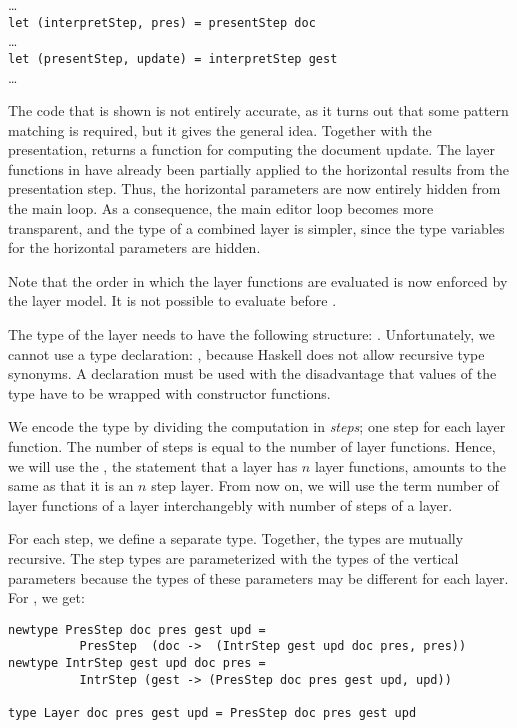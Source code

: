 \dots\\
{\tt let (interpretStep, pres) = presentStep doc}\\
\dots\\
{\tt let (presentStep, update) = interpretStep gest}\\
\dots

The code that is shown is not entirely accurate, as it turns out that some pattern matching is required, but it gives the general idea. Together with the presentation,  returns a function  for computing the document update. The layer functions in  have already been partially applied to the horizontal results from the presentation step. Thus, the horizontal parameters are now entirely hidden from the main loop.  As a consequence, the main editor loop becomes more transparent, and the type of a combined layer is simpler, since the type variables for the horizontal parameters are hidden.

\bc Note that the order in which the layer functions are evaluated is now enforced by the layer model. It is not possible to evaluate  before .  \ec



The type of the layer needs to have the following structure: 
.  Unfortunately, we cannot use a type declaration: , because Haskell does not allow recursive type synonyms. A  declaration must be used with the disadvantage that values of the type have to be wrapped with constructor functions.

We encode the type by dividing the computation in {\em steps}; one step for each layer function. The number of steps is equal to the number of layer functions. Hence, we will use the , the statement that a layer has $n$ layer functions, amounts to the same as that it is an $n$ step layer. From now on, we will use the term number of layer functions of a layer interchangebly with number of steps of a layer.

For each step, we define a separate type. Together, the types are mutually recursive. The step types are parameterized with the types of the vertical parameters because the types of these parameters may be different for each layer. For , we get:

\begin{small}
\begin{verbatim}
newtype PresStep doc pres gest upd = 
          PresStep  (doc ->  (IntrStep gest upd doc pres, pres))
newtype IntrStep gest upd doc pres = 
          IntrStep (gest -> (PresStep doc pres gest upd, upd)) 

type Layer doc pres gest upd = PresStep doc pres gest upd  
\end{verbatim}
\end{small}

